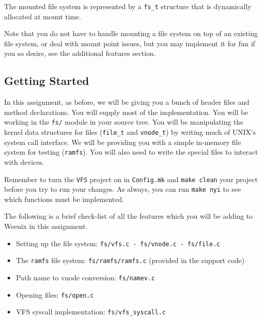 The mounted file system is represented by a \texttt{fs\_t} structure that is dynamically allocated at mount time.

Note that you do not have to handle mounting a file system on top of an existing file system, or deal with mount point issues, but you may implement it for fun if you so desire, see the additional features section.

\subsection{Getting Started}

\begin{comment} %
The virtual file system (VFS) is an interface providing a clearly defined link between the operating system kernel and the various file systems. The VFS makes it simple to add many different file systems to your kernel and give them a single UNIX-style interface: with a VFS, you can play music by writing to \texttt{/dev/audio}, you can list your processes by reading \texttt{/proc/}, and things you don't want to see to \texttt{/dev/null}. Linux supports lots of different file systems -- e.g. users who don't want to copy all of their Windows files over to a Linux file system can keep them safely on an NTFS partition.
\end{comment}

In this assignment, as before, we will be giving you a bunch of header files and method declarations. You will supply most of the implementation. You will be working in the \texttt{fs/} module in your source tree. You will be manipulating the kernel data structures for files (\texttt{file\_t} and \texttt{vnode\_t}) by writing much of UNIX's system call interface. We will be providing you with a simple in-memory file system for testing (\texttt{ramfs}). You will also need to write the special files to interact with devices.

Remember to turn the \texttt{VFS} project on in \texttt{Config.mk} and \texttt{make clean} your project before you try to run your changes. As always, you can run \texttt{make nyi} to see which functions must be implemented.

The following is a brief check-list of all the features which you will be adding to Weenix in this assignment.

\begin{itemize}
\item Setting up the file system: \texttt{fs/vfs.c - fs/vnode.c - fs/file.c}
\item The \texttt{ramfs} file system: \texttt{fs/ramfs/ramfs.c} (provided in the support code)
\item Path name to vnode conversion: \texttt{fs/namev.c}
\item Opening files: \texttt{fs/open.c}
\item VFS syscall implementation: \texttt{fs/vfs\_syscall.c}
\end{itemize}

